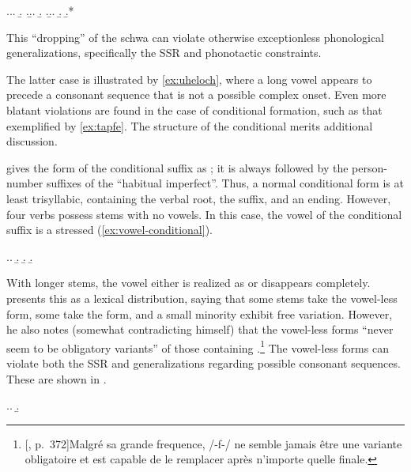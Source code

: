 \ex.\a.\a.
\b.\label{ex:uheloch}
\z.\b.\a.
\b.\label{ex:tapfe}
\z.\b.\a.
\b.
\b.*

This \enquote{dropping} of the schwa can violate otherwise exceptionless phonological generalizations, specifically the SSR and phonotactic constraints.

The latter case is illustrated by \cref{ex:uheloch}, where a long vowel appears to precede a consonant sequence that is not a possible complex onset. Even more blatant violations are found in the case of conditional formation, such as that exemplified by \ref{ex:tapfe}. The structure of the conditional merits additional discussion.

\citet{humphreys95:_phonol_bothoa_saint_nicol_pelem} gives the form of the conditional suffix as ; it is always followed by the person-number suffixes of the \enquote{habitual imperfect}. Thus, a normal conditional form is at least trisyllabic, containing the verbal root, the  suffix, and an ending. However, four verbs possess stems with no vowels. In this case, the vowel of the conditional suffix is a stressed \ipa{[æ]} (\cref{ex:vowel-conditional}).

\ex.\label{ex:vowel-conditional}\a.
\b.
\b.
\b.

With longer stems, the vowel either is realized as \ipa{[ə]} or disappears completely. \citet{humphreys95:_phonol_bothoa_saint_nicol_pelem} presents this as a lexical distribution, saying that some stems take the vowel-less form, some take the  form, and a small minority exhibit free variation. However, he also notes (somewhat contradicting himself) that the vowel-less forms \enquote{never seem to be obligatory variants} of those containing \ipa{[əf]}.\footnote{[\citealt{humphreys95:_phonol_bothoa_saint_nicol_pelem}, p.~372]{Malgré sa grande frequence, /-f-/ ne semble jamais être une variante obligatoire et \mbox{} est capable de le remplacer après n'importe quelle finale.}} The vowel-less forms can violate both the SSR and generalizations regarding possible consonant sequences. These are shown in .

\ex.\label{ex:long-before-schwa-f}\a.
\b.

